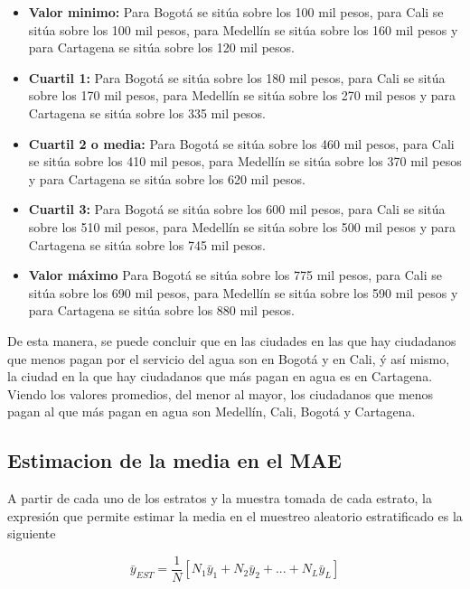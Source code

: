 \documentclass[10pt]{article}
\begin{document}
        \begin{itemize}
            \item \textbf{Valor minimo:} Para Bogotá se sitúa sobre los 100 mil pesos, para Cali se sitúa sobre los 100 mil pesos, para Medellín se sitúa sobre los 160 mil pesos y para Cartagena se sitúa sobre los 120 mil pesos.
            \item \textbf{Cuartil 1:} Para Bogotá se sitúa sobre los 180 mil pesos, para Cali se sitúa sobre los 170 mil pesos, para Medellín se sitúa sobre los 270 mil pesos y para Cartagena se sitúa sobre los 335 mil pesos.
            \item \textbf{Cuartil 2 o media:} Para Bogotá se sitúa sobre los 460 mil pesos, para Cali se sitúa sobre los 410 mil pesos, para Medellín se sitúa sobre los 370 mil pesos y para Cartagena se sitúa sobre los 620 mil pesos.
            \item \textbf{Cuartil 3:} Para Bogotá se sitúa sobre los 600 mil pesos, para Cali se sitúa sobre los 510 mil pesos, para Medellín se sitúa sobre los 500 mil pesos y para Cartagena se sitúa sobre los 745 mil pesos.
            \item \textbf{Valor máximo} Para Bogotá se sitúa sobre los 775 mil pesos, para Cali se sitúa sobre los 690 mil pesos, para Medellín se sitúa sobre los 590 mil pesos y para Cartagena se sitúa sobre los 880 mil pesos.
        \end{itemize}

        De esta manera, se puede concluir que en las ciudades en las que hay ciudadanos que menos pagan por el servicio del agua son en Bogotá y en Cali, ý así mismo, la ciudad en la que hay ciudadanos que más pagan en agua es en Cartagena. Viendo los valores promedios, del menor al mayor, los ciudadanos que menos pagan al que más pagan en agua son Medellín, Cali, Bogotá y Cartagena.

        \subsection*{Estimacion de la media en el MAE} 

        A partir de cada uno de los estratos y la muestra tomada de cada estrato, la expresión que permite estimar la media en el muestreo aleatorio estratificado es la siguiente

            $$
             \bar{y}_{EST}=\frac{1}{N} \left [ N_1 \bar{y}_{1} + N_2 \bar{y}_{2} +...+ N_L \bar{y}_{L}\right ]
            $$
            
\end{document}
